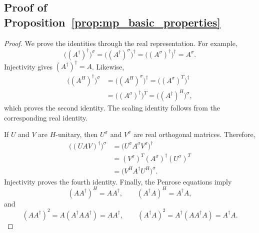 \documentclass[12pt,a4paper]{article}
\theoremstyle{plain}
\theoremstyle{definition}
\theoremstyle{remark}
\begin{document}
\subsection{Proof of Proposition~\ref{prop:mp_basic_properties}}
\label{app:proof-basic-mp}
\begin{proof}
We prove the identities through the real representation. For example,
\[
    \bigl((A^\dagger)^\dagger\bigr)^\sigma =\bigl((A^\dagger)^\sigma\bigr)^\dagger =\bigl((A^\sigma)^\dagger\bigr)^\dagger =A^\sigma.
\]
Injectivity gives \((A^\dagger)^\dagger=A\). Likewise,
\begin{align*}
    \bigl((A^H)^\dagger\bigr)^\sigma
    &=\bigl((A^H)^\sigma\bigr)^\dagger =\bigl((A^\sigma)^T\bigr)^\dagger\\
    &=\bigl((A^\sigma)^\dagger\bigr)^T =\bigl((A^\dagger)^H\bigr)^\sigma,
\end{align*}
which proves the second identity. The scaling identity follows from the corresponding real identity.

If \(U\) and \(V\) are \(H\)-unitary, then \(U^\sigma\) and \(V^\sigma\) are real orthogonal matrices. Therefore,
\begin{align*}
    \bigl((UAV)^\dagger\bigr)^\sigma
    &=\bigl(U^\sigma A^\sigma V^\sigma\bigr)^\dagger\\
    &=(V^\sigma)^T(A^\sigma)^\dagger(U^\sigma)^T\\
    &=\bigl(V^H A^\dagger U^H\bigr)^\sigma.
\end{align*}
Injectivity proves the fourth identity. Finally, the Penrose equations imply
\[
    (AA^\dagger)^H=AA^\dagger, \qquad (A^\dagger A)^H=A^\dagger A,
\]
and
\[
    (AA^\dagger)^2=A(A^\dagger A A^\dagger)=AA^\dagger, \qquad (A^\dagger A)^2=A^\dagger(AA^\dagger A)=A^\dagger A.
\]
\end{proof}
\end{document}
